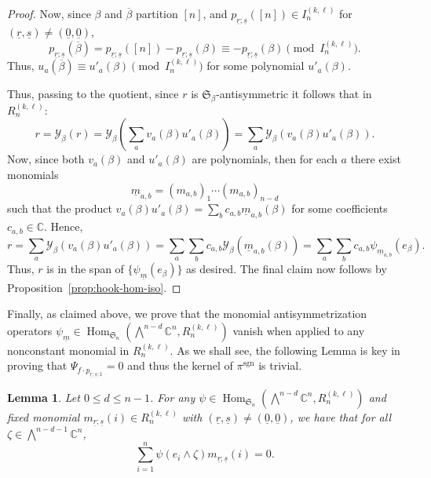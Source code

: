 \documentclass[11pt, reqno]{amsart}
\newtheorem{lemma}[theorem]{Lemma}
\theoremstyle{definition}
\theoremstyle{remark}
\numberwithin{equation}{section}
\newcommand{\0}{\emptyset}
\newcommand{\C}{\mathbb{C}}
\renewcommand{\S}{\mathfrak{S}}
\newcommand{\cY}{\mathcal{Y}}
\newcommand{\m}{\underline{m}}
\renewcommand{\r}{\underline{r}}
\newcommand{\s}{\underline{s}}
\DeclareMathOperator{\sgn}{sgn}
\DeclareMathOperator{\Hom}{Hom}
\begin{document}
\begin{proof}
    Now, since $\beta$ and $\overline{\beta}$ partition $[n]$, 
    and $p_{\r;\s}([n]) \in I_n^{(k,\ell)}$ for $(\r,\s) \neq (\underline{0},\underline{0})$, 
    \[
        p_{\r;\s}(\overline{\beta}) = p_{\r;\s}([n]) - p_{\r;\s}({\beta})
        \equiv -p_{\r;\s}({\beta})\pmod {I_n^{(k,\ell)}}.
    \]
    Thus, $u_a(\overline{\beta}) \equiv u'_a(\beta) \pmod {I_n^{(k,\ell)}}$ 
    for some polynomial $u'_a(\beta)$.

    Thus, passing to the quotient, since $r$ is $\S_\beta$-antisymmetric 
    it follows that in $R_n^{(k,\ell)}$:
    \[
        r = \cY_\beta(r) 
        = \cY_\beta \left( \sum_{a} v_a(\beta) u'_a(\beta)\right) 
        = \sum_a \cY_\beta(v_a(\beta) u'_a(\beta)).
    \]
    Now, since both $v_a(\beta)$ and $u'_a(\beta)$ are polynomials, 
    then for each $a$ there exist monomials 
    \[
        \m_{a,b} = (m_{a,b})_1 \cdots (m_{a,b})_{n-d}
    \]
    such that the product $v_a(\beta) u'_a(\beta) =\sum_b c_{a,b} \m_{a,b}(\beta)$ 
    for some coefficients $c_{a,b} \in \C$. Hence,
    \[
        r = \sum_a \cY_\beta(v_a(\beta) u'_a(\beta)) 
        = \sum_a \sum_b c_{a,b} \cY_\beta( \m_{a,b}(\beta))
        = \sum_a \sum_b c_{a,b} \psi_{\m_{a,b}}(e_\beta).  
    \]
    Thus, $r$ is in the span of $\{\psi_{\m}(e_\beta)\}$ as desired. 
    The final claim now follows by Proposition~\ref{prop:hook-hom-iso}.
\end{proof}

Finally, as claimed above, we prove that the monomial antisymmetrization operators 
$\psi_{\m} \in \Hom_{\S_n}\left(\bigwedge^{n-d} \C^{n}, R_n^{(k,\ell)}\right)$ vanish 
when applied to any nonconstant monomial in $R_n^{(k,\ell)}$. 
As we shall see, the following Lemma is key in proving that 
$\Psi_{f \cdot p_{\r;\s;1}} = 0$ and thus the kernel of $\pi^{\sgn}$ is trivial.

\begin{lemma}\label{lem:Zero-sum}  Let $0\leq d \leq n-1$. 
    For any $\psi \in \Hom_{\S_n}\left(\bigwedge^{n-d}\C^n, R_n^{(k,\ell)}\right)$ and fixed monomial 
    $m_{\r;\s}(i) \in R_n^{(k,\ell)}$ with $(\r,\s) \neq (\underline{0},\underline{0})$, 
    we have that for all $\zeta \in \bigwedge^{n-d-1}\C^n$,
    \[
        \sum_{i=1}^n \psi(e_i \wedge \zeta) m_{\r;\s}(i) = 0. 
    \]
\end{lemma}
\end{document}
